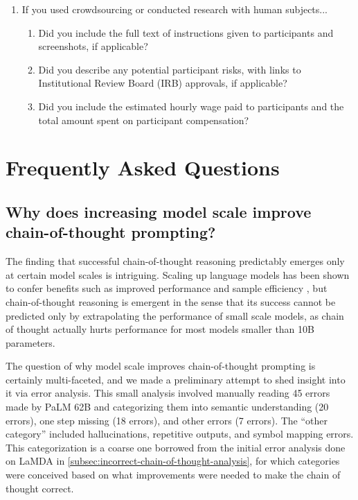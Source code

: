 \documentclass[]{article}
\theoremstyle{plain}
\theoremstyle{definition}
\theoremstyle{remark}
\newcommand{\lamda}[0]{LaMDA}
\newcommand{\palm}[0]{PaLM}
\begin{document}
\begin{enumerate}
\item If you used crowdsourcing or conducted research with human subjects...
\begin{enumerate}
  \item Did you include the full text of instructions given to participants and screenshots, if applicable?
    \answerNA{}
  \item Did you describe any potential participant risks, with links to Institutional Review Board (IRB) approvals, if applicable?
    \answerNA{}
  \item Did you include the estimated hourly wage paid to participants and the total amount spent on participant compensation?
    \answerNA{}
\end{enumerate}


\end{enumerate}


\newpage
\clearpage
\appendix





\clearpage
\section{Frequently Asked Questions}\label{sec:faq}

\subsection{Why does increasing model scale improve chain-of-thought prompting?}\label{subsec:why-scale-helps}

The finding that successful chain-of-thought reasoning predictably emerges only at certain model scales is intriguing.
Scaling up language models has been shown to confer benefits such as improved performance and sample efficiency \citep{kaplan2020scaling}, but chain-of-thought reasoning is emergent in the sense that its success cannot be predicted only by extrapolating the performance of small scale models, as chain of thought actually hurts performance for most models smaller than 10B parameters.

The question of why model scale improves chain-of-thought prompting is certainly multi-faceted, and we made a preliminary attempt to shed insight into it via error analysis. 
This small analysis involved manually reading 45 errors made by \palm{} 62B and categorizing them into semantic understanding (20 errors), one step missing (18 errors), and other errors (7 errors). 
The ``other category'' included hallucinations, repetitive outputs, and symbol mapping errors.
This categorization is a coarse one borrowed from the initial error analysis done on \lamda{} in \cref{subsec:incorrect-chain-of-thought-analysis}, for which categories were conceived based on what improvements were needed to make the chain of thought correct.
\end{document}
